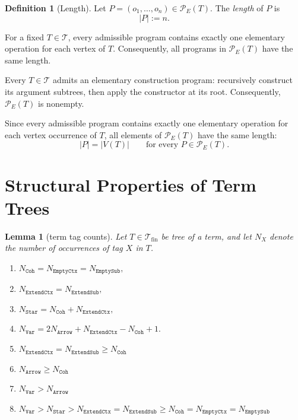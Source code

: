 \documentclass{article}%
\newtheorem{lemma}[theorem]{Lemma}
\theoremstyle{remark}
\theoremstyle{definition}
\theoremstyle{definition}
\newtheorem{definition}[theorem]{Definition}
\theoremstyle{plain}
\begin{document}
\begin{definition}[Length]
\label{def:program-length}
Let \(P=(o_1,\ldots,o_n)\in\mathcal{P}_E(T)\).
The \emph{length} of \(P\) is
\[
  |P| := n.
\]

For a fixed \(T\in\mathcal{T}\), every admissible program contains exactly one
elementary operation for each vertex of \(T\). Consequently, all programs in
\(\mathcal{P}_E(T)\) have the same length.
\end{definition}

Every \(T\in\mathcal{T}\) admits an elementary construction program: recursively
construct its argument subtrees, then apply the constructor at its root.
Consequently, \(\mathcal{P}_E(T)\) is nonempty.

Since every admissible program contains exactly one elementary operation for
each vertex occurrence of \(T\), all elements of \(\mathcal{P}_E(T)\) have the
same length:
\[
  |P| = |V(T)|
  \qquad\text{for every } P\in\mathcal{P}_E(T).
\]

\section{Structural Properties of Term Trees}
\begin{lemma}[\catt term tag counts]
\label{lem:catt-term-tag-counts}
Let \(T\in\mathcal{T}_\text{fin}\) be tree of a term, and let \(N_X\) denote the number
of occurrences of tag \(X\) in \(T\).
\begin{enumerate}
  \item \(N_{\mathtt{Coh}} = N_{\mathtt{EmptyCtx}} = N_{\mathtt{EmptySub}},\)
  \item \(N_{\mathtt{ExtendCtx}} = N_{\mathtt{ExtendSub}},\)
  \item \(N_{\mathtt{Star}} = N_{\mathtt{Coh}}+N_{\mathtt{ExtendCtx}},\) 
  \item \(N_{\mathtt{Var}} =
  2N_{\mathtt{Arrow}}+N_{\mathtt{ExtendCtx}}-N_{\mathtt{Coh}}+1. \)
  \item \(N_{\mathtt{ExtendCtx}} =
  N_{\mathtt{ExtendSub}} \ge N_{\mathtt{Coh}}\)
  \item \(N_{\mathtt{Arrow}}\ge N_{\mathtt{Coh}}\)
  \item \(N_{\mathtt{Var}} > N_{\mathtt{Arrow}}\)
  \item \(
  N_{\mathtt{Var}} > N_{\mathtt{Star}} > N_{\mathtt{ExtendCtx}} =
  N_{\mathtt{ExtendSub}} \ge N_{\mathtt{Coh}} = N_{\mathtt{EmptyCtx}} =
  N_{\mathtt{EmptySub}}
  \)
\end{enumerate}
\end{lemma}
\end{document}
